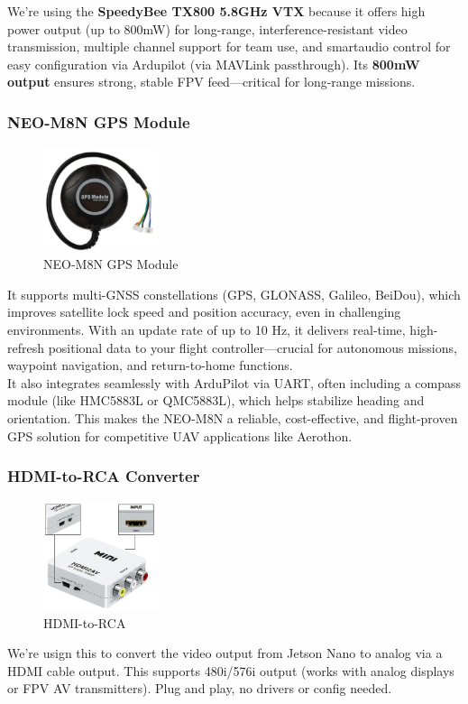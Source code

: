 \documentclass[12pt]{report}
\begin{document}
        We're using the \textbf{SpeedyBee TX800 5.8GHz VTX} because it offers high power output (up to 800mW) for long-range, interference-resistant video transmission, multiple channel support for team use, and smartaudio control for easy configuration via Ardupilot (via MAVLink passthrough). Its \textbf{800mW output} ensures strong, stable FPV feed—critical for long-range missions.

        \subsubsection{\large NEO-M8N GPS Module}
         \begin{figure}
        \includegraphics[width=0.3\textwidth]{gps.png}
        \caption{NEO-M8N GPS Module}
        \label{fig:gps}
      \end{figure}

        It supports multi-GNSS constellations (GPS, GLONASS, Galileo, BeiDou), which improves satellite lock speed and position accuracy, even in challenging environments. With an update rate of up to 10 Hz, it delivers real-time, high-refresh positional data to your flight controller—crucial for autonomous missions, waypoint navigation, and return-to-home functions. \\ 
             
        It also integrates seamlessly with ArduPilot via UART, often including a compass module (like HMC5883L or QMC5883L), which helps stabilize heading and orientation. This makes the NEO-M8N a reliable, cost-effective, and flight-proven GPS solution for competitive UAV applications like Aerothon.

        \subsubsection{\large HDMI-to-RCA Converter}
         \begin{figure}
        \includegraphics[width=0.3\textwidth]{hdmi2rca.png}
        \caption{HDMI-to-RCA}
        \label{fig:hdmi2rca}
      \end{figure}
      We're usign this to convert the video output from Jetson Nano to analog via a HDMI cable output. This supports 480i/576i output (works with analog displays or FPV AV transmitters). Plug and play, no drivers or config needed.\\ 
\end{document}
